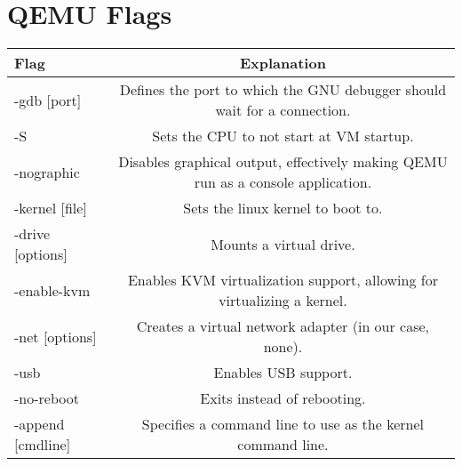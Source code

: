 \documentclass[letterpaper,10pt,titlepage,draftclsnofoot,onecolumn]{IEEEtran}
\begin{document}
\section{QEMU Flags}
\begin{tabular}{l | c}
Flag & Explanation \\
\hline
-gdb [port] & Defines the port to which the GNU debugger should wait for a connection. \\
-S & Sets the CPU to not start at VM startup. \\
-nographic & Disables graphical output, effectively making QEMU run as a console application. \\
-kernel [file] & Sets the linux kernel to boot to. \\
-drive [options] & Mounts a virtual drive. \\
-enable-kvm & Enables KVM virtualization support, allowing for virtualizing a kernel. \\
-net [options] & Creates a virtual network adapter (in our case, none). \\
-usb & Enables USB support. \\
-no-reboot & Exits instead of rebooting. \\
-append [cmdline] & Specifies a command line to use as the kernel command line. \\
\end{tabular}
\end{document}
